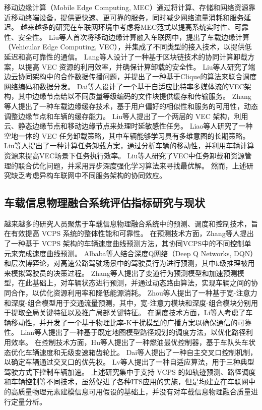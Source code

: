 移动边缘计算（Mobile Edge Computing, MEC）\cite{mao2017a}通过将计算、存储和网络资源靠近移动终端设备，提供更快速、更可靠的服务，同时减少网络流量消耗和服务延迟。
越来越多的研究在车联网环境中考虑将MEC范式以提高系统实时性、可靠性、安全性。
Liu等人\cite{liu2017a}首次将移动边缘计算融入车联网中，提出了车载边缘计算（Vehicular Edge Computing, VEC），并集成了不同类型的接入技术，以提供低延迟和高可靠性的通信。
Lang等人\cite{lang2022cooperative}设计了一种基于区块链技术的协同计算卸载方案，以提高 VEC 资源的利用效率，并确保计算卸载的安全性。
Liu等人\cite{liu2021fog}研究了端边云协同架构中的合作数据传播问题，并提出了一种基于Clique的算法来联合调度网络编码和数据分发。
Dai等人\cite{dai2021edge}设计了一个基于自适应比特率多媒体流的VEC架构，其中边缘节点给以不同质量等级编码的文件块提供缓存和传输服务。
Zhang等人\cite{zhang2022digital}提出了一种车载边缘缓存技术，基于用户偏好的相似性和服务的可用性，动态调整边缘节点和车辆的缓存能力。
Liu等人\cite{liu2020adaptive}提出了一个两层的 VEC 架构，利用云、静态边缘节点和移动边缘节点来处理时延敏感性任务。
Liao等人\cite{liao2021learning}研究了一种空地一体的 VEC 任务卸载策略，其中车辆能够学习具有多维意图的长期策略。
Liu等人\cite{liu2023mobility}提出了一种计算任务卸载方案，通过分析车辆的移动性，并利用车辆计算资源来提高VEC场景下任务执行效率。
Liu等人\cite{liu2023asynchronous}研究了VEC中任务卸载和资源管理的联合优化问题，并采用异步深度强化学习算法来寻找最优解。
然而，上述研究缺乏考虑异构车联网中不同服务架构的协同效应。

\subsection{车载信息物理融合系统评估指标研究与现状}

越来越多的研究人员聚焦于车载信息物理融合系统中的预测、调度和控制技术，旨在有效提高 VCPS 系统的整体性能和可靠性。
在预测技术方面，Zhang等人\cite{zhang2021a}提出了一种基于 VCPS 架构的车辆速度曲线预测方法，其协同VCPS中的不同控制单元来完成速度曲线预测。
Albaba等人\cite{albaba2021driver}结合深度Q网络（Deep Q Networks, DQN）和层次博弈论，对高速公路驾驶场景中的驾驶员行为进行预测，其中k级推理被用来模拟驾驶员的决策过程。
Zhang等人\cite{zhang2020data}提出了变道行为预测模型和加速预测模型，在此基础上，对车辆状态进行预测，并通过动态路由算法，实现车辆之间的协同合作，以优化资源利用率和降低能源消耗。
Zhou等人\cite{zhou2021wide}提出了一种基于宽-注意力和深度-组合模型用于交通流量预测，其中，宽-注意力模块和深度-组合模块分别用于提取全局关键特征以及推广局部关键特征。
在调度技术方面，Li等人\cite{li2020cyber}考虑了车辆移动性，并开发了一个基于物理比率-K干扰模型的广播方案以确保通信的可靠性。
Lian等人\cite{lian2021cyber}提出了一种基于既定地图模型路径规划的调度方法，以优化路径利用效率。
在控制技术方面，Hu等人\cite{hu2017cyber}提出了一种燃油最优控制器，基于车队头车状态优化车辆速度和无级变速箱齿轮比。
Dai等人\cite{dai2016a}提出了一种自主交叉口控制机制，以确定车辆通过交叉口的优先权。
Lv等人\cite{lv2018driving}提出了一种自适应算法，用于三种典型驾驶方式下控制车辆加速。
上述研究集中于支持 VCPS 的如轨迹预测、路径调度和车辆控制等不同技术，虽然促进了各种ITS应用的实施，但是均建立在车联网中的高质量物理元素建模信息可用假设的基础上，并没有对车载信息物理融合质量进行定量分析。

